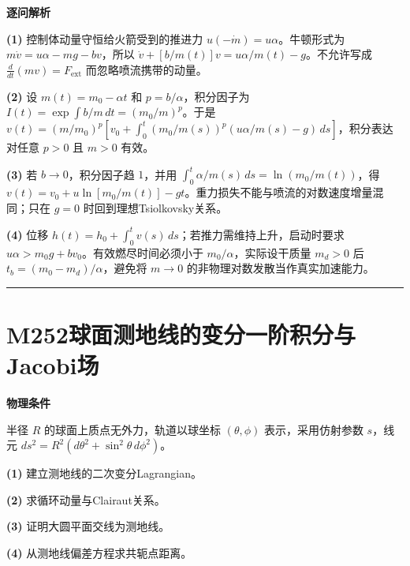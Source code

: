 \documentclass[UTF8,a4paper,11pt,oneside,openany]{ctexbook}
\begin{document}
\par\medskip\noindent\textbf{逐问解析}
\par\noindent\textbf{(1)} 控制体动量守恒给火箭受到的推进力 \(u(-\dot m)=u\alpha\)。牛顿形式为 \(m\dot v=u\alpha-mg-bv\)，所以 \(\dot v+[b/m(t)]v=u\alpha/m(t)-g\)。不允许写成 \(\frac{d}{dt}(mv)=F_{\mathrm{ext}}\) 而忽略喷流携带的动量。
\par\noindent\textbf{(2)} 设 \(m(t)=m_0-\alpha t\) 和 \(p=b/\alpha\)，积分因子为 \(I(t)=\exp\int b/m\,dt=(m_0/m)^p\)。于是 \(v(t)=(m/m_0)^p\left[v_0+\int_0^t(m_0/m(s))^p(u\alpha/m(s)-g)\,ds\right]\)，积分表达对任意 \(p>0\) 且 \(m>0\) 有效。
\par\noindent\textbf{(3)} 若 \(b\to0\)，积分因子趋 \(1\)，并用 \(\int_0^t \alpha/m(s)\,ds=\ln(m_0/m(t))\)，得 \(v(t)=v_0+u\ln[m_0/m(t)]-gt\)。重力损失不能与喷流的对数速度增量混同；只在 \(g=0\) 时回到理想Tsiolkovsky关系。
\par\noindent\textbf{(4)} 位移 \(h(t)=h_0+\int_0^t v(s)\,ds\)；若推力需维持上升，启动时要求 \(u\alpha>m_0g+bv_0\)。有效燃尽时间必须小于 \(m_0/\alpha\)，实际设干质量 \(m_d>0\) 后 \(t_b=(m_0-m_d)/\alpha\)，避免将 \(m\to0\) 的非物理对数发散当作真实加速能力。

\par\bigskip\hrule\bigskip
\section*{M252\quad 球面测地线的变分一阶积分与Jacobi场}
\textbf{物理条件}\par 半径 \(R\) 的球面上质点无外力，轨道以球坐标 \((\theta,\phi)\) 表示，采用仿射参数 \(s\)，线元 \(ds^2=R^2(d\theta^2+\sin^2\theta\,d\phi^2)\)。
\par\noindent\textbf{(1)} 建立测地线的二次变分Lagrangian。
\par\noindent\textbf{(2)} 求循环动量与Clairaut关系。
\par\noindent\textbf{(3)} 证明大圆平面交线为测地线。
\par\noindent\textbf{(4)} 从测地线偏差方程求共轭点距离。
\end{document}
